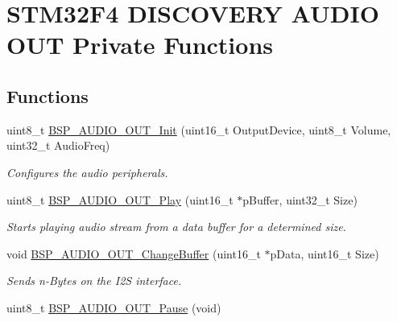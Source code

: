 \hypertarget{group___s_t_m32_f4___d_i_s_c_o_v_e_r_y___a_u_d_i_o___o_u_t___private___functions}{}\section{S\+T\+M32\+F4 D\+I\+S\+C\+O\+V\+E\+RY A\+U\+D\+IO O\+UT Private Functions}
\label{group___s_t_m32_f4___d_i_s_c_o_v_e_r_y___a_u_d_i_o___o_u_t___private___functions}
\subsection*{Functions}
\begin{DoxyCompactItemize}
\item 
uint8\+\_\+t \mbox{\hyperlink{group___s_t_m32_f4___d_i_s_c_o_v_e_r_y___a_u_d_i_o___o_u_t___private___functions_gae713c698a93ff492424c6a8363f53bcc}{B\+S\+P\+\_\+\+A\+U\+D\+I\+O\+\_\+\+O\+U\+T\+\_\+\+Init}} (uint16\+\_\+t Output\+Device, uint8\+\_\+t Volume, uint32\+\_\+t Audio\+Freq)
\begin{DoxyCompactList}\small\item\em Configures the audio peripherals. \end{DoxyCompactList}\item 
uint8\+\_\+t \mbox{\hyperlink{group___s_t_m32_f4___d_i_s_c_o_v_e_r_y___a_u_d_i_o___o_u_t___private___functions_gaa415fdd481a01468fdfcd9d91f0f6711}{B\+S\+P\+\_\+\+A\+U\+D\+I\+O\+\_\+\+O\+U\+T\+\_\+\+Play}} (uint16\+\_\+t $\ast$p\+Buffer, uint32\+\_\+t Size)
\begin{DoxyCompactList}\small\item\em Starts playing audio stream from a data buffer for a determined size. \end{DoxyCompactList}\item 
void \mbox{\hyperlink{group___s_t_m32_f4___d_i_s_c_o_v_e_r_y___a_u_d_i_o___o_u_t___private___functions_gacbc557827ebf62fdd9a0ceb21fd89b2b}{B\+S\+P\+\_\+\+A\+U\+D\+I\+O\+\_\+\+O\+U\+T\+\_\+\+Change\+Buffer}} (uint16\+\_\+t $\ast$p\+Data, uint16\+\_\+t Size)
\begin{DoxyCompactList}\small\item\em Sends n-\/\+Bytes on the I2S interface. \end{DoxyCompactList}\item 
uint8\+\_\+t \mbox{\hyperlink{group___s_t_m32_f4___d_i_s_c_o_v_e_r_y___a_u_d_i_o___o_u_t___private___functions_ga73a0f92b8adbfb2e8207067434c2bfef}{B\+S\+P\+\_\+\+A\+U\+D\+I\+O\+\_\+\+O\+U\+T\+\_\+\+Pause}} (void)

\end{DoxyCompactItemize}
